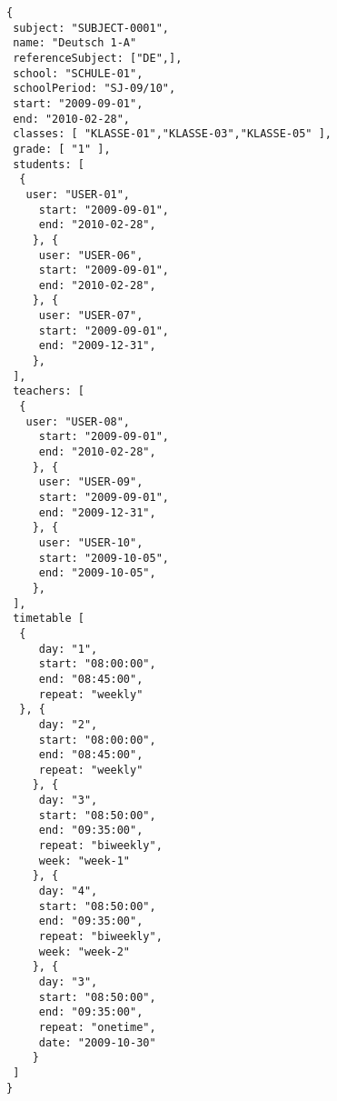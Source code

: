 
\begin{lstlisting}[caption={Beispiel eines Schulfachs},frame=tlrb]
{
 subject: "SUBJECT-0001",
 name: "Deutsch 1-A"
 referenceSubject: ["DE",],
 school: "SCHULE-01",
 schoolPeriod: "SJ-09/10",
 start: "2009-09-01",
 end: "2010-02-28",
 classes: [ "KLASSE-01","KLASSE-03","KLASSE-05" ],
 grade: [ "1" ],
 students: [
  { 
   user: "USER-01",
	 start: "2009-09-01",
	 end: "2010-02-28",
	}, { 
	 user: "USER-06",
	 start: "2009-09-01",
	 end: "2010-02-28",
	}, { 
	 user: "USER-07",
	 start: "2009-09-01",
	 end: "2009-12-31",
	},
 ],
 teachers: [
  { 
   user: "USER-08",
	 start: "2009-09-01",
	 end: "2010-02-28",
	}, { 
	 user: "USER-09",
	 start: "2009-09-01",
	 end: "2009-12-31",
	}, { 
	 user: "USER-10",
	 start: "2009-10-05",
	 end: "2009-10-05",
	},
 ],
 timetable [
  {
	 day: "1",
	 start: "08:00:00",
	 end: "08:45:00",
	 repeat: "weekly"
  }, {
	 day: "2",
	 start: "08:00:00",
	 end: "08:45:00",
	 repeat: "weekly"
	}, {
	 day: "3",
	 start: "08:50:00",
	 end: "09:35:00",
	 repeat: "biweekly",
	 week: "week-1"
	}, {
	 day: "4",
	 start: "08:50:00",
	 end: "09:35:00",
	 repeat: "biweekly",
	 week: "week-2"
	}, {
	 day: "3",
	 start: "08:50:00",
	 end: "09:35:00",
	 repeat: "onetime",
	 date: "2009-10-30"
	}	 
 ]
}
\end{lstlisting}
